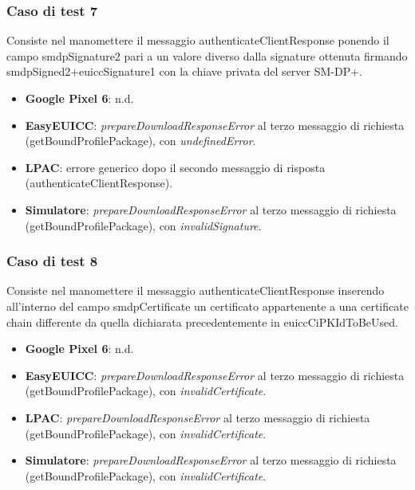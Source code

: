 \documentclass[10pt, oneside]{book}
\begin{document}
\subsubsection{Caso di test 7}
Consiste nel manomettere il messaggio authenticateClientResponse ponendo il campo smdpSignature2 pari a un valore diverso dalla signature ottenuta firmando smdpSigned2+euiccSignature1 con la chiave privata del server SM-DP+.
\begin{itemize}
\item \textbf{Google Pixel 6}: n.d.
\item \textbf{EasyEUICC}: \textit{prepareDownloadResponseError} al terzo messaggio di richiesta (getBoundProfilePackage), con \textit{undefinedError}.
\item \textbf{LPAC}: errore generico dopo il secondo messaggio di risposta (authenticateClientResponse).
\item \textbf{Simulatore}: \textit{prepareDownloadResponseError} al terzo messaggio di richiesta (getBoundProfilePackage), con \textit{invalidSignature}.
\end{itemize}

\subsubsection{Caso di test 8}
Consiste nel manomettere il messaggio authenticateClientResponse inserendo all’interno del campo smdpCertificate un certificato appartenente a una certificate chain differente da quella dichiarata precedentemente in euiccCiPKIdToBeUsed.
\begin{itemize}
\item \textbf{Google Pixel 6}: n.d.
\item \textbf{EasyEUICC}: \textit{prepareDownloadResponseError} al terzo messaggio di richiesta (getBoundProfilePackage), con \textit{invalidCertificate}.
\item \textbf{LPAC}: \textit{prepareDownloadResponseError} al terzo messaggio di richiesta (getBoundProfilePackage), con \textit{invalidCertificate}.
\item \textbf{Simulatore}: \textit{prepareDownloadResponseError} al terzo messaggio di richiesta (getBoundProfilePackage), con \textit{invalidCertificate}.
\end{itemize}
\end{document}
